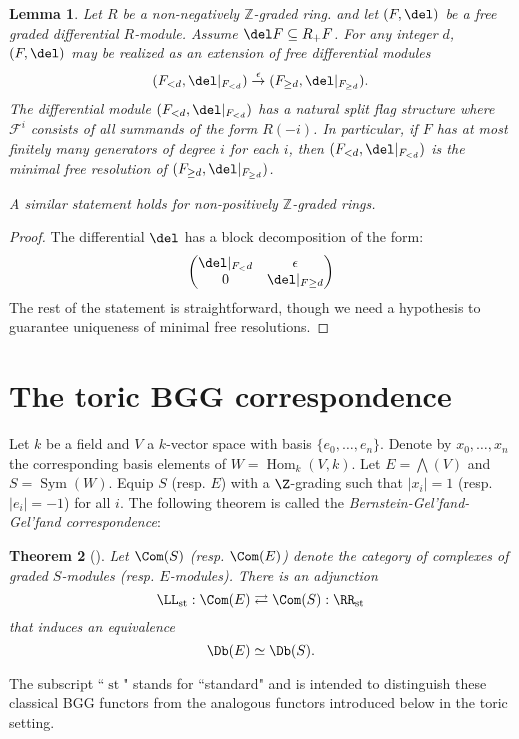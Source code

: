 \documentclass[12pt]{amsart}
\newtheorem{lemma}{Lemma}[section]
\newtheorem{thm}[lemma]{Theorem}
\theoremstyle{definition}
\theoremstyle{remark}
\newcommand{\ZZ}{\mathbb Z}
\newcommand{\Hom}{\operatorname{Hom}} %
\newcommand{\Sym}{\operatorname{Sym}} %
\def\on{\operatorname}
\begin{document}
\begin{lemma}\label{lem:ZZ to flag}
Let $R$ be a non-negatively $\ZZ$-graded ring. and let $(F,\del)$ be a free graded differential $R$-module.  Assume $\del F\subseteq R_+F$.  For any integer $d$, $(F,\del)$ may be realized as an extension of free differential modules
\[
(F_{<d}, \del|_{F_{<d}}) \overset{\epsilon}{\to} (F_{\geq d}, \del|_{F_{\geq d}}).
\]
The differential module $(F_{<d}, \del|_{F_{<d}}) $ has a natural split flag structure where $\mathcal F^i$ consists of all summands of the form $R(-i)$.  In particular, if $F$ has at most finitely many generators of degree $i$ for each $i$, then $(F_{<d}, \del|_{F_{<d}}) $ is the minimal free resolution of $ (F_{\geq d}, \del|_{F_{\geq d}})$.

A similar statement holds for non-positively $\ZZ$-graded rings.
\end{lemma}
\begin{proof}
The differential $\del$ has a block decomposition of the form:
\[
\begin{pmatrix}
\del|_{F_<d} & \epsilon\\
0 & \del|_{F\geq d}
\end{pmatrix}
\]
The rest of the statement is straightforward, though we need a hypothesis to guarantee uniqueness of minimal free resolutions.
\end{proof}




\section{The toric BGG correspondence}

Let $k$ be a field and $V$ a $k$-vector space with basis $\{e_0, \dots, e_n\}$. Denote by $x_0, \dots, x_n$ the corresponding basis elements of $W = \Hom_k(V, k)$. Let $E = \bigwedge(V)$ and $S = \Sym(W)$. Equip $S$ (resp. $E$) with a $\Z$-grading such that $|x_i| = 1$ (resp. $|e_i| = -1$) for all $i$. The following theorem is called the \emph{Bernstein-Gel'fand-Gel'fand correspondence}:

\begin{thm}[\cite{BGG}] 
Let $\Com(S)$ (resp. $\Com(E)$) denote the category of complexes of graded $S$-modules (resp. $E$-modules). There is an adjunction 
$$
\LL_{\on{st}} : \Com(E) \rightleftarrows \Com(S) : \RR_{\on{st}} 
$$
that induces an equivalence
$$
\Db(E) \simeq \Db(S).
$$
\end{thm}
The subscript ``$\on{st}$" stands for ``standard" and is intended to distinguish these classical BGG functors from the analogous functors introduced below in the toric setting.
\end{document}
